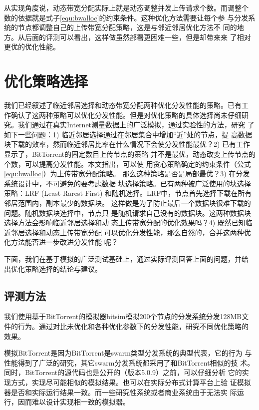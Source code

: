 
从实现角度说，动态带宽分配实际上就是动态调整并发上传请求个数。而调整个
数的依据就是式子\ref{equ:bwalloc}的约束条件。这种优化方法需要让每个参
与分发系统的节点都调整自己的上传带宽分配策略，这是与邻近邻居优化方法不
同的地方。从后面的评测可以看出，这样做虽然部署更困难一些，但是却带来来
了相对更优的优化性能。

\section{优化策略选择}
\label{sec:bteval}

我们已经叙述了临近邻居选择和动态带宽分配两种优化分发性能的策略。已有工
作确认了这两种策略可以优化分发性能。但是对优化策略的具体选择尚未仔细研
究。我们通过在真实Internet测量数据上的广泛模拟，通过实验性的方法，研究
了如下一些问题：1) 临近邻居选择通过在邻居集合中增加“近”处的节点，提
高数据块下载的效率，然而临近邻居比率在什么情况下会使分发性能最优？2)
已有工作\cite{Bharambe2006}显示了，BitTorrent的固定数目上传节点的策略
并不是最优，动态改变上传节点的个数，可以提高分发性能。本文指出，可以使
用贪心策略确定的约束条件（公式\ref{equ:bwalloc}）为上传带宽分配策略。
那么这种策略是否是局部最优？3) 在分发系统设计中，不可避免的要考虑数据
块选择策略。已有两种被广泛使用的块选择策略：LRF (Least-Rarest-First)
和随机选择。LRF中，节点首先选择下载在所有邻居范围内，副本最少的数据块。
这样做是为了防止最后一个数据块很难下载的问题。随机数据块选择中，节点只
是随机请求自己没有的数据块。这两种数据块选择方法会影响临近邻居选择和动
态上传带宽分配的优化效果吗？4) 既然已知临近邻居选择和动态上传带宽分配
可以优化分发性能，那么自然的，合并这两种优化方法能否进一步改进分发性能
呢？

下面，我们在基于模拟的广泛测试基础上，通过实际评测回答上面的问题，并给
出优化策略选择的结论与建议。

\subsection{评测方法}

我们使用基于BitTorrent的模拟器bitsim模拟200个节点的分发系统分发128MB文
件的行为。通过对比未优化和各种优化参数下的分发性能，研究不同优化策略的
效果。

模拟BitTorrent是因为BitTorrent是swarm类型分发系统的典型代表，它的行为
与性能得到了广泛的研究，其它swarm分发系统都采用了和BitTorrent相似的技
术。同时，BitTorrent的源代码也是公开的（版本5.0.9）之前，可以仔细分析
它的实现方式，实现尽可能相似的模拟结果。也可以在实际分布式计算平台上验
证模拟器是否和实际运行结果一致。而一些研究性系统或者商业系统由于无法实
际运行，因而难以设计实现相一致的模拟器。

